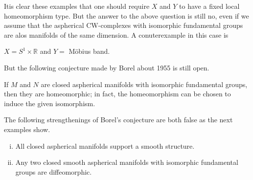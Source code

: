 \begin{figure}[H]
\end{figure}

It\pageoriginale is clear these examples that one should require $X$ and $Y$ to have
a fixed local homeomorphism type. But the answer to the above question
is still no, even if we assume that the aspherical CW-complexes with
isomorphic fundamental groups are alos manifolds of the same
dimension. A conuterexample in this case is 
\begin{center}
  $X= S^1 \times \mathbb{R}$ and $Y=$ M\"obius band.
\end{center}

But the following conjecture made by Borel about 1955 is still open.

\begin{conj}[Borel]\label{c1:conj1.3}
  If $M$ and $N$ are closed aspherical manifolds with isomorphic
  fundamental groups, then they are homeomorphic; in fact, the
  homeomorphism can be chosen to induce the given isomorphism.
\end{conj}

\begin{remark*}
  The following strengthenings of Borel's conjecture are both false as
  the next examples show.
  \begin{enumerate}[(i)]
    \item All closed aspherical manifolds support a smooth structure.
      \item Any two closed smooth aspherical manifolds with isomorphic
        fundamental groups are diffeomorphic.
  \end{enumerate}
\end{remark*}

